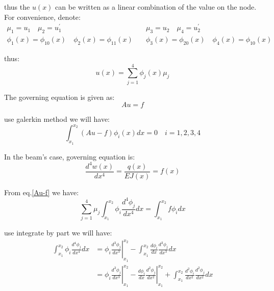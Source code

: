 thus the $u(x)$ can be written as a linear combination of the value on the node. 
For convenience, denote:
\begin{equation}
    \begin{aligned}
        \mu_1=u_1\quad
    \mu_2=u_1^\prime\quad
    &
    \mu_3=u_2\quad
    \mu_4=u_2^\prime\\
    \phi_1(x)=\phi_{10}(x)\quad
    \phi_2(x)=\phi_{11}(x)\quad
    &
    \phi_3(x)=\phi_{20}(x)\quad
    \phi_4(x)=\phi_{10}(x)\quad
    \end{aligned}
\end{equation}

thus:
\begin{equation}
    u(x)=
    \sum_{j=1}^4
    \phi_j(x)\mu_j
\end{equation}

The governing equation is given as:
\begin{equation}
    Au=f
\end{equation}

use galerkin method we will have:
\begin{equation}
    \label{Au-f}
    \int_{x_1}^{x_2}
    (Au-f)\phi_i(x)
    dx=0
    \quad i=1,2,3,4
\end{equation}

In the beam's case, governing equation is:
\begin{equation}
    \frac{d^4w(x)}{dx^4}=
    \frac{q(x)}{EJ(x)}=f(x)
\end{equation}

From eq.\ref{Au-f} we have:
\begin{equation}
    \sum_{j=1}^4
    \mu_j
    \int_{x_1}^{x_2}
    \phi_i\frac{d^4\phi_j}{dx^4}dx
    =
    \int_{x_1}^{x_2}
    f\phi_i
    dx
\end{equation}

use integrate by part we will have:
\begin{equation}
    \begin{aligned}
        \int_{x_1}^{x_2}
        \phi_i\frac{d^4\phi_j}{dx^4}
        dx
        &=
        \left.
        \phi_i\frac{d^3\phi_j}{dx^3}
        \right|_{x_1}^{x_2}
        -
        \int_{x_1}^{x_2}
        \frac{d\phi_i}{dx}\frac{d^3\phi_j}{dx^3}
        dx\\
        &=
        \left.
        \phi_i\frac{d^3\phi_j}{dx^3}
        \right|_{x_1}^{x_2}
        -
        \left.
        \frac{d\phi_i}{dx}\frac{d^2\phi_j}{dx^2}    
        \right|_{x_1}^{x_2}
        +
        \int_{x_1}^{x_2}
        \frac{d^2\phi_i}{dx^2}
        \frac{d^2\phi_j}{dx^2}
        dx
    \end{aligned}
\end{equation}

